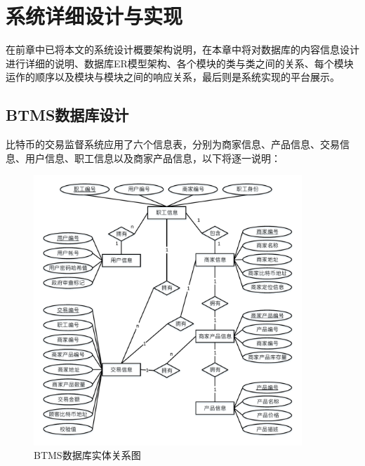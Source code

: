 \chapter{系统详细设计与实现}
在前章中已将本文的系统设计概要架构说明，在本章中将对数据库的内容信息设计进行详细的说明、数据库ER模型架构、各个模块的类与类之间的关系、每个模块运作的顺序以及模块与模块之间的响应关系，最后则是系统实现的平台展示。

	\section{BTMS数据库设计}

	比特币的交易监督系统应用了六个信息表，分别为商家信息、产品信息、交易信息、用户信息、职工信息以及商家产品信息，以下将逐一说明：

		\begin{figure}[!htbp]
			\centering
			\includegraphics[width = 0.9\textwidth]{er.pdf}
			\caption{BTMS数据库实体关系图}\label{db}
		\end{figure}

